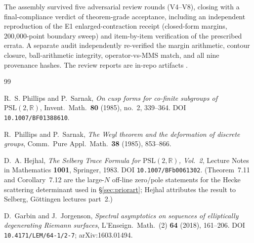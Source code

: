 \documentclass[11pt]{article}
\theoremstyle{definition}
\theoremstyle{remark}
\begin{document}
The assembly survived five adversarial review rounds (V4--V8), closing
with a final-compliance verdict of theorem-grade acceptance, including
an independent reproduction of the E1 enlarged-contraction receipt
(closed-form margins, 200{,}000-point boundary sweep) and item-by-item
verification of the prescribed errata. A separate audit independently
re-verified the margin arithmetic, contour closure, ball-arithmetic
integrity, operator-vs-MMS match, and all nine provenance hashes. The
review reports are in-repo artifacts \cite{ReviewChain,AuditK3}.

\begin{thebibliography}{99}


R.~S. Phillips and P.~Sarnak,
\emph{On cusp forms for co-finite subgroups of $\mathrm{PSL}(2,\mathbb{R})$},
Invent.\ Math.\ \textbf{80} (1985), no.~2, 339--364.
DOI \texttt{10.1007/BF01388610}. %

R.~Phillips and P.~Sarnak,
\emph{The Weyl theorem and the deformation of discrete groups},
Comm.\ Pure Appl.\ Math.\ \textbf{38} (1985), 853--866.

D.~A. Hejhal,
\emph{The Selberg Trace Formula for $\mathrm{PSL}(2,\mathbb{R})$, Vol.~2},
Lecture Notes in Mathematics \textbf{1001}, Springer, 1983.
DOI \texttt{10.1007/BFb0061302}.
(Theorem~7.11 and Corollary~7.12 are the large-$N$ off-line
zero/pole statements for the Hecke scattering determinant used in
\S\ref{sec:priorart}; Hejhal attributes the result to Selberg,
G\"ottingen lectures part~2.)

D.~Garbin and J.~Jorgenson,
\emph{Spectral asymptotics on sequences of elliptically degenerating
Riemann surfaces},
L'Enseign.\ Math.\ (2) \textbf{64} (2018), 161--206.
DOI \texttt{10.4171/LEM/64-1/2-7}; arXiv:1603.01494.


\end{thebibliography}
\end{document}
